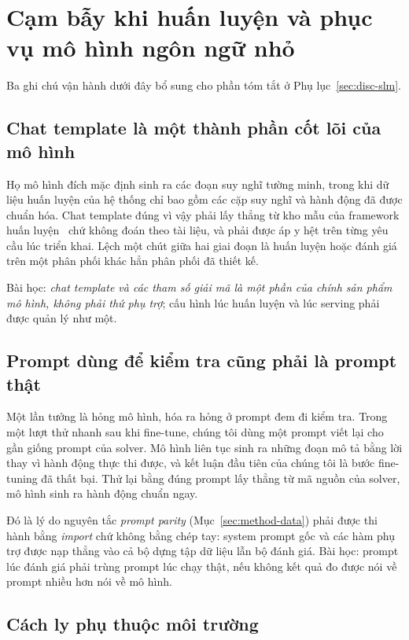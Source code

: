 \section{Cạm bẫy khi huấn luyện và phục vụ mô hình ngôn ngữ nhỏ}
\label{app:slm-pitfalls}

Ba ghi chú vận hành dưới đây bổ sung cho phần tóm tắt ở
Phụ lục~\ref{sec:disc-slm}.

\subsection*{Chat template là một thành phần cốt lõi của mô hình}

Họ mô hình đích mặc định sinh ra các đoạn suy nghĩ tường minh, trong khi dữ liệu huấn luyện của hệ thống chỉ bao gồm các cặp suy nghĩ và hành động đã được chuẩn hóa. Chat template đúng vì vậy phải lấy thẳng từ kho mẫu của framework huấn luyện~\cite{zheng2024llamafactory} chứ không đoán theo tài liệu, và phải được áp y hệt trên từng yêu cầu lúc triển khai. Lệch một chút giữa hai giai đoạn là huấn luyện hoặc đánh giá trên một phân phối khác hẳn phân phối đã thiết kế.

Bài học: \emph{chat template và các tham số giải mã là một phần của chính sản phẩm mô hình, không phải thứ phụ trợ}; cấu hình lúc huấn luyện và lúc serving phải được quản lý như một.

\subsection*{Prompt dùng để kiểm tra cũng phải là prompt thật}

Một lần tưởng là hỏng mô hình, hóa ra hỏng ở prompt đem đi kiểm tra. Trong một lượt thử nhanh sau khi fine-tune, chúng tôi dùng một prompt viết lại cho gần giống prompt của solver. Mô hình liên tục sinh ra những đoạn mô tả bằng lời thay vì hành động thực thi được, và kết luận đầu tiên của chúng tôi là bước fine-tuning đã thất bại. Thử lại bằng đúng prompt lấy thẳng từ mã nguồn của solver, mô hình sinh ra hành động chuẩn ngay.

Đó là lý do nguyên tắc \emph{prompt parity} (Mục~\ref{sec:method-data}) phải được thi hành bằng \emph{import} chứ không bằng chép tay: system prompt gốc và các hàm phụ trợ được nạp thẳng vào cả bộ dựng tập dữ liệu lẫn bộ đánh giá. Bài học: prompt lúc đánh giá phải trùng prompt lúc chạy thật, nếu không kết quả đo được nói về prompt nhiều hơn nói về mô hình.


\subsection*{Cách ly phụ thuộc môi trường}

